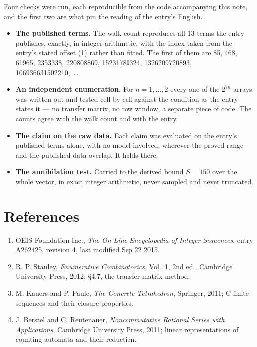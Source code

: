 \documentclass[11pt]{article}
\theoremstyle{definition}
\begin{document}
Four checks were run, each reproducible from the code accompanying this note, and the first two are what pin the reading of the entry's English.

\begin{itemize}

\item {\bfseries The published terms.} The walk count reproduces all 13 terms the entry publishes, exactly, in integer arithmetic, with the index taken from the entry's stated offset (1) rather than fitted. The first of them are 85, 468, 61965, 2353338, 220808869, 15231780324, 1326209720893, 106936631502210,~\dots

\item {\bfseries An independent enumeration.} For $n = 1,\dots,2$ every one of the $2^{7n}$ arrays was written out and tested cell by cell against the condition as the entry states it --- no transfer matrix, no row window, a separate piece of code. The counts agree with the walk count and with the entry.

\item {\bfseries The claim on the raw data.} Each claim was evaluated on the entry's published terms alone, with no model involved, wherever the proved range and the published data overlap. It holds there.

\item {\bfseries The annihilation test.} Carried to the derived bound $S = 150$ over the whole vector, in exact integer arithmetic, never sampled and never truncated.

\end{itemize}

\section{References}

\begin{enumerate}

\item OEIS Foundation Inc., \emph{The On-Line Encyclopedia of Integer Sequences}, entry \href{https://oeis.org/A262425}{A262425}, revision 4, last modified Sep 22 2015.

\item R. P. Stanley, \emph{Enumerative Combinatorics}, Vol.~1, 2nd ed., Cambridge University Press, 2012; \S4.7, the transfer-matrix method.

\item M. Kauers and P. Paule, \emph{The Concrete Tetrahedron}, Springer, 2011; C-finite sequences and their closure properties.

\item J. Berstel and C. Reutenauer, \emph{Noncommutative Rational Series with Applications}, Cambridge University Press, 2011; linear representations of counting automata and their reduction.

\end{enumerate}
\end{document}
